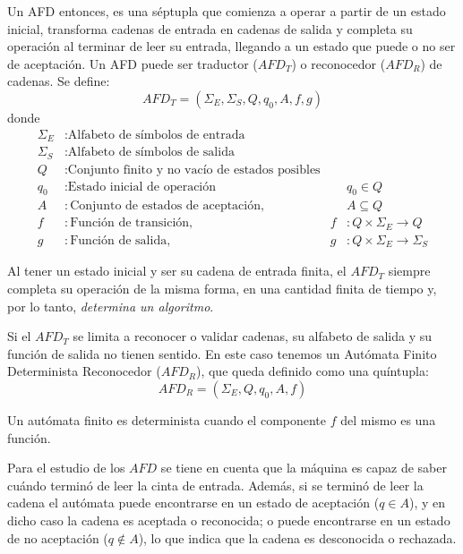 \documentclass[12pt]{article}
\begin{document}
Un AFD entonces, es una séptupla que comienza a operar a partir de un estado inicial, transforma cadenas de entrada en cadenas de salida y completa su operación al terminar de leer su entrada, llegando a un estado que puede o no ser de aceptación. Un AFD puede ser traductor ($ AFD_{T} $) o reconocedor ($ AFD_{R} $) de cadenas. Se define:
\[
AFD_{T} = \left(\Sigma_{E},\Sigma_{S},Q,q_{0},A,f,g\right)
\]
donde
\begin{align*}
  \Sigma_{E} &: \text{Alfabeto de símbolos de entrada}\\
  \Sigma_{S} &: \text{Alfabeto de símbolos de salida}\\
  Q &: \text{Conjunto finito y no vacío de estados posibles}\\
  q_{0} &: \text{Estado inicial de operación} && q_{0} \in Q\\
  A &: \text{Conjunto de estados de aceptación}, && A \subseteq Q\\
  f &: \text{Función de transición}, & f&:Q\times \Sigma_{E} \to Q\\
  g &: \text{Función de salida}, & g&:Q\times \Sigma_{E} \to \Sigma_{S}
\end{align*}

Al tener un estado inicial y ser su cadena de entrada finita, el $ AFD_{T} $ siempre completa su operación de la misma forma, en una cantidad finita de tiempo y, por lo tanto, \textit{determina un algoritmo}.

Si el $ AFD_{T} $ se limita a reconocer o validar cadenas, su alfabeto de salida y su función de salida no tienen sentido. En este caso tenemos un Autómata Finito Determinista Reconocedor ($ AFD_{R} $), que queda definido como una quíntupla:
\[
AFD_{R} = \left(\Sigma_{E},Q,q_{0},A,f\right)
\]

Un autómata finito es determinista cuando el componente $ f $ del mismo es una función.

Para el estudio de los $ AFD $ se tiene en cuenta que la máquina es capaz de saber cuándo terminó de leer la cinta de entrada. Además, si se terminó de leer la cadena el autómata puede encontrarse en un estado de aceptación ($ q \in A $), y en dicho caso la cadena es aceptada o reconocida; o puede encontrarse en un estado de no aceptación ($ q \notin A $), lo que indica que la cadena es desconocida o rechazada.
\end{document}

